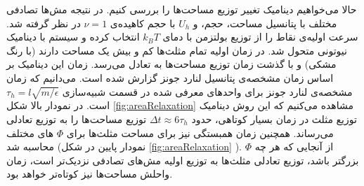 حالا می‌خواهیم دینامیک تغییر توزیع مساحت‌ها را بررسی کنیم. در نتیجه مش‌ها تصادفی مختلف با پتانسیل مساحت، حجم، و
$U_h$
با حجم کاهیده‌ی 
$\nu=1$
در نظر گرفته شد. سرعت اولیه‌ی نقاط را از توزیع بولتزمن با دمای
$k_BT$
انتخاب کرده و سیستم با دینامیک نیوتونی متحول شد. در زمان اولیه تمام مثلث‌ها کم و بیش یک مساحت دارند (با رنگ مشکی) و با گذشت زمان توزیع مساحت‌ها به تعادل می‌رسد. زمان این دینامیک بر اساس زمان مشخصه‌ی پتانسیل لنارد جونز گزارش شده است. می‌دانیم که زمان مشخصه‌ی لنارد جونز برای واحد‌های معرفی شده در قسمت شبیه‌سازی
$\tau_h=l\sqrt{m/\epsilon}$
است. در نمودار بالا شکل
\ref{fig:areaRelaxation}
مشاهده می‌کنیم که این روش دینامیک توزیع مثلث در زمان بسیار کوتاهی، حدود
$\Delta t \approx6\tau_h$
توزیع مساحت‌ها را به توزیع تعادلی می‌رساند. همچنین زمان همبستگی نیز برای مساحت مثلث‌ها برای 
$\Phi$
های مختلف محاسبه‌ شد (نمودار پایین در شکل
\ref{fig:areaRelaxation}
). از آنجایی که هر چه
$\Phi$
بزرگتر باشد، توزیع تعادلی مثلث‌ها به توزیع اولیه مش‌های تصادفی نزدیک‌تر است، زمان واحلش مساحت‌ها نیز کوتاه‌تر خواهد بود.


